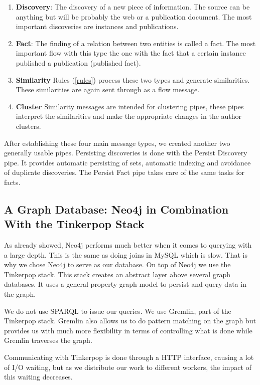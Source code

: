 \begin{enumerate}
\item \textbf{Discovery}: The discovery of a new piece of information. The source can be anything but will be probably the web or a publication document. The most important discoveries are instances and publications.
\item \textbf{Fact}: The finding of a relation between two entities is called a fact. The most important flow with this type the one with the fact that a certain instance published a publication (published fact).
\item \textbf{Similarity} Rules (\autoref{rules}) process these two types and generate similarities. These similarities are again sent through as a flow message.
\item \textbf{Cluster} Similarity messages are intended for clustering pipes, these pipes interpret the similarities and make the appropriate changes in the author clusters.
\end{enumerate}

After establishing these four main message types, we created another two generally usable pipes. Persisting discoveries is done with the Persist Discovery pipe. It provides automatic persisting of sets, automatic indexing and avoidance of duplicate discoveries. The Persist Fact pipe takes care of the same tasks for facts.

\subsection{A Graph Database: Neo4j in Combination With the Tinkerpop Stack}

As already showed, Neo4j performs much better when it comes to querying with a large depth. This is the same as doing joins in MySQL which is slow. That is why we chose Neo4j to serve as our database. On top of Neo4j we use the Tinkerpop stack. This stack creates an abstract layer above several graph databases. It uses a general property graph model to persist and query data in the graph.

We do not use SPARQL to issue our queries. We use Gremlin, part of the Tinkerpop stack. Gremlin also allows us to do pattern matching on the graph but provides us with much more flexibility in terms of controlling what is done while Gremlin traverses the graph.

Communicating with Tinkerpop is done through a HTTP interface, causing a lot of I/O waiting, but as we distribute our work to different workers, the impact of this waiting decreases.

